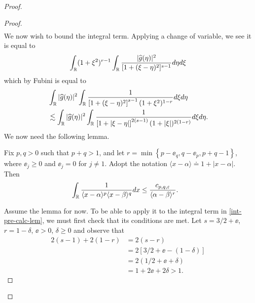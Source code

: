 \begin{proof}
\begin{proof}
\begin{equation}
\begin{split}
  \end{split}
\end{equation}
%
We now wish to bound the integral term. Applying a change of variable, we see it
is equal to
%
\begin{equation*}
\begin{split}
  \int_{\mathbb{R}} (1 + \xi^{2})^{r-1} \int_{\mathbb{R}}
\frac{| \widehat{g}(\eta) |^{2}}{[1 + (\xi - \eta)^{2}]^{s-1}} d \eta d \xi
  \end{split}
\end{equation*}
which by Fubini is equal to
%
%
\begin{equation}
  \label{int-pre-calc-lem}
\begin{split}
  & \int_{\mathbb{R}} | \widehat{g}(\eta) |^{2} \int_{\mathbb{R}} \frac{1}{\left[
  1 + (\xi - \eta)^{2} \right]^{s-1} (1 + \xi^{2})^{1-r}} d \xi d \eta
  \\
  & \lesssim \int_{\mathbb{R}} | \widehat{g}(\eta) |^{2} \int_{\mathbb{R}} \frac{1}{\left[
  1 + |\xi - \eta| \right]^{2(s-1)} (1 + |\xi|)^{2(1-r)}} d \xi d \eta.
\end{split}
\end{equation}
%
%
We now need the following lemma.
%
%
\begin{lemma}
	\label{lem:calc}
  Fix $p, q > 0$ such that $p +q >1$, and let $r =\min\left\{p - \ee_{q}, q - \ee_{p}, p+q-1
 \right\}$, where $\ee_{j} \ge 0$ and $\ee_{j} = 0$ for $j \neq 1$. Adopt the notation
 $\langle x - \alpha \rangle  \doteq 1 + | x - \alpha |$. Then 
  \begin{equation*}
\begin{split}
  & \int_{\mathbb{R}} \frac{1}{\langle x - \alpha \rangle ^{p} \langle x -
  \beta \rangle
  ^{q}} d x
  \le \frac{c_{p,q, \varepsilon}}{\langle \alpha - \beta \rangle ^{r}}. 
  \end{split}
\end{equation*}
\end{lemma}
Assume the lemma for now. To be able to apply it to the integral term in \eqref{int-pre-calc-lem}, 
we must first check
that its conditions are met. Let $ s = 3/2 + \ee$, $r = 1- \delta$, $\ee > 0$, $
\delta \ge 0$ and observe that
%
%
\begin{equation*}
\begin{split}
2(s-1) + 2(1-r)
& = 2(s-r)
\\
& = 2[3/2 + \ee - (1 - \delta)]
\\
& = 2(1/2 + \ee + \delta)
\\
& = 1 + 2 \ee + 2 \delta > 1.
\end{split}
\end{equation*}

\end{proof}
\end{proof}
